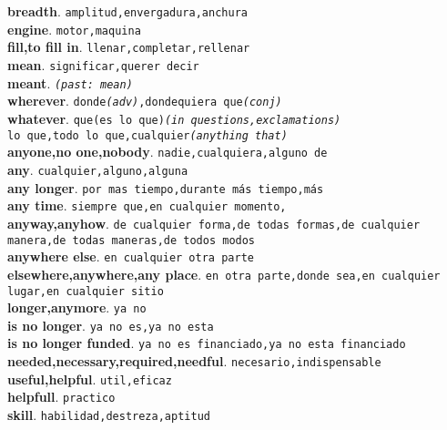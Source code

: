 \documentclass[twocolumn]{article}
\begin{document}
	\textsf{\textbf{breadth}}. \texttt{amplitud,envergadura,anchura}\\
	\textsf{\textbf{engine}}. \texttt{motor,maquina}\\
	\textsf{\textbf{fill,to fill in}}. \texttt{llenar,completar,rellenar}\\
	\textsf{\textbf{mean}}. \texttt{significar,querer decir}\\
	\textsf{\textbf{meant}}. \texttt{{\scriptsize \textsl{(past: mean)}}}\\
	\textsf{\textbf{wherever}}. \texttt{donde{\scriptsize \textsl{(adv)}},dondequiera que{\scriptsize \textsl{(conj)}}}\\
	\textsf{\textbf{whatever}}. \texttt{que(es lo que){\scriptsize \textsl{(in questions,exclamations)}}\\
										         lo que,todo lo que,cualquier{\scriptsize \textsl{(anything that)}}}\\
	\textsf{\textbf{anyone,no one,nobody}}. \texttt{nadie,cualquiera,alguno de}\\
	\textsf{\textbf{any}}. \texttt{cualquier,alguno,alguna}\\
	\textsf{\textbf{any longer}}. \texttt{por mas tiempo,durante m\'as tiempo,m\'as}\\
	\textsf{\textbf{any time}}. \texttt{siempre que,en cualquier momento,}\\
	\textsf{\textbf{anyway,anyhow}}. \texttt{de cualquier forma,de todas formas,de cualquier manera,de todas maneras,de todos modos}\\
	\textsf{\textbf{anywhere else}}. \texttt{en cualquier otra parte}\\
	\textsf{\textbf{elsewhere,anywhere,any place}}. \texttt{en otra parte,donde sea,en cualquier lugar,en cualquier sitio}\\
	\textsf{\textbf{longer,anymore}}. \texttt{ya no}\\
	\textsf{\textbf{is no longer}}. \texttt{ya no es,ya no esta}\\
	\textsf{\textbf{is no longer funded}}. \texttt{ya no es financiado,ya no esta financiado}\\
	\textsf{\textbf{needed,necessary,required,needful}}. \texttt{necesario,indispensable}\\
	\textsf{\textbf{useful,helpful}}. \texttt{util,eficaz}\\
	\textsf{\textbf{helpfull}}. \texttt{practico}\\
	\textsf{\textbf{skill}}. \texttt{habilidad,destreza,aptitud}\\
\end{document}
